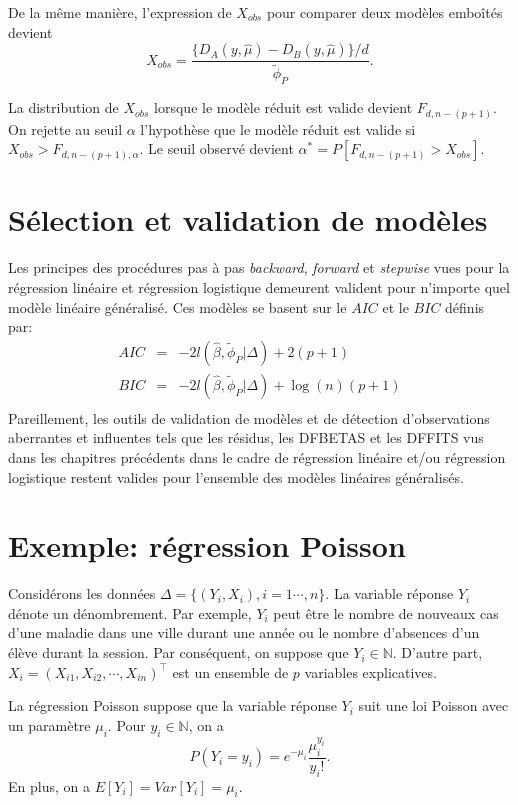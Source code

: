 \documentclass[11pt]{article}
\begin{document}
\noindent De la m\^eme mani\`ere, l'expression de $X_{obs}$ pour comparer deux mod\`eles embo\^it\'es devient
$$X_{obs} = \frac{\{D_A(y,\hat\mu)-D_B(y,\hat\mu)\}/d}{\tilde \phi_P}.$$

\noindent La distribution de $X_{obs}$ lorsque le mod\`ele r\'eduit est valide devient $F_{d,n-(p+1)}$. On rejette au seuil $\alpha$ l'hypoth\`ese que le mod\`ele r\'eduit est valide si $X_{obs}>F_{d,n-(p+1),\alpha}$. Le seuil observ\'e devient $\alpha^*=P[F_{d,n-(p+1)} > X_{obs}]$.

\section{S\'election et validation de mod\`eles}

Les principes des proc\'edures pas \`a pas {\it backward}, {\it forward} et {\it stepwise} vues pour la r\'egression lin\'eaire et r\'egression logistique demeurent valident pour n'importe quel mod\`ele lin\'eaire g\'en\'eralis\'e. Ces mod\`eles se basent sur le $AIC$ et le $BIC$ d\'efinis par:
\begin{eqnarray*}
AIC &=& -2 l(\hat\beta,\tilde\phi_P|\Delta) + 2 (p+1) \\
BIC &=& -2 l(\hat\beta,\tilde\phi_P|\Delta) + \log(n) (p+1) \\
\end{eqnarray*}
\noindent Pareillement, les outils de validation de mod\`eles et de d\'etection d'observations aberrantes et influentes tels que les r\'esidus, les DFBETAS et les DFFITS vus dans les chapitres pr\'ec\'edents dans le cadre de r\'egression lin\'eaire et/ou r\'egression logistique restent valides pour l'ensemble des mod\`eles lin\'eaires g\'en\'eralis\'es.

\section{Exemple: r\'egression Poisson}

Consid\'erons les donn\'ees $\Delta=\{(Y_i,X_i),i=1\cdots,n\}$. La variable r\'eponse $Y_i$ d\'enote un d\'enombrement. Par exemple, $Y_i$ peut \^etre le nombre de nouveaux cas d'une maladie dans une ville durant une ann\'ee ou le nombre d'absences d'un \'el\`eve durant la session. Par cons\'equent, on suppose que $Y_i \in \mathbb{N}$. D'autre part, $X_i=(X_{i1},X_{i2},\cdots,X_{in})^\top$ est un ensemble de $p$ variables explicatives.

\noindent La r\'egression Poisson suppose que la variable r\'eponse $Y_i$ suit une loi Poisson avec un param\`etre $\mu_i$. Pour $y_i \in \mathbb{N}$, on a $$P(Y_i=y_i)=e^{-\mu_i} \frac{\mu_i^{y_i}}{y_i!}.$$
\noindent En plus, on a $E[Y_i]=Var[Y_i]=\mu_i$.
\end{document}
